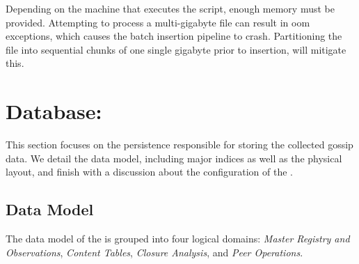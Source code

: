 Depending on the machine that executes the  script, enough memory must be provided.
Attempting to process a multi-gigabyte file can result in \gls{oom} exceptions, which causes the batch insertion pipeline to crash.
Partitioning the file into sequential chunks of one single gigabyte prior to insertion, will mitigate this.


\section{Database: }
\label{sec:database}

This section focuses on the persistence responsible for storing the collected gossip data. 
We detail the data model, including major indices as well as the physical layout,
and finish with a discussion about the configuration of the . 


\subsection{Data Model}
The data model of the  is grouped into four logical domains: 
\textit{Master Registry and Observations}, \textit{Content Tables}, 
\textit{Closure Analysis}, and \textit{Peer Operations}. 

